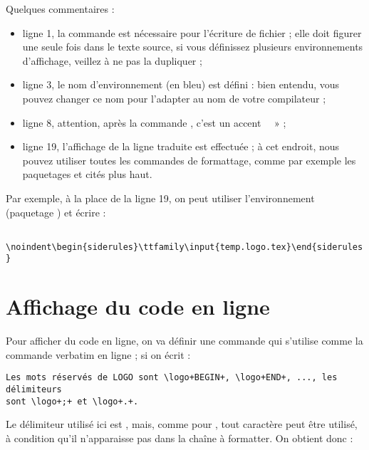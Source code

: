 Quelques commentaires :
\begin{itemize}
  \item ligne 1, la commande  est nécessaire pour l'écriture de fichier ; elle doit figurer une seule fois dans le texte source, si vous définissez plusieurs environnements d'affichage, veillez à ne pas la dupliquer ; 
  \item ligne 3, le nom d'environnement (en bleu) est défini : bien entendu, vous pouvez changer ce nom pour l'adapter au nom de votre compilateur ;
  \item ligne 8, attention, après la commande , c'est un accent ~~» ;
  \item ligne 19, l'affichage de la ligne traduite est effectuée ; à cet endroit, nous pouvez utiliser toutes les commandes de formattage, comme par exemple les paquetages  et  cités plus haut.
\end{itemize}

Par exemple, à la place de la ligne 19, on peut utiliser l'environnement  (paquetage ) et écrire :

\texttt{
\textbackslash noindent\textbackslash begin\{siderules\}\textbackslash ttfamily\textbackslash input\{temp.logo.tex\}\textbackslash end\{siderules\}
}












\section{Affichage du code en ligne}

Pour afficher du code en ligne, on va définir une commande  qui s'utilise comme la commande verbatim en ligne  ; si on écrit :

\begin{verbatim}
Les mots réservés de LOGO sont \logo+BEGIN+, \logo+END+, ..., les délimiteurs
sont \logo+;+ et \logo+.+.
\end{verbatim}

Le délimiteur utilisé ici est \tpp{+}, mais, comme pour , tout caractère peut être utilisé, à condition qu'il n'apparaisse pas dans la chaîne à formatter. On obtient donc :

